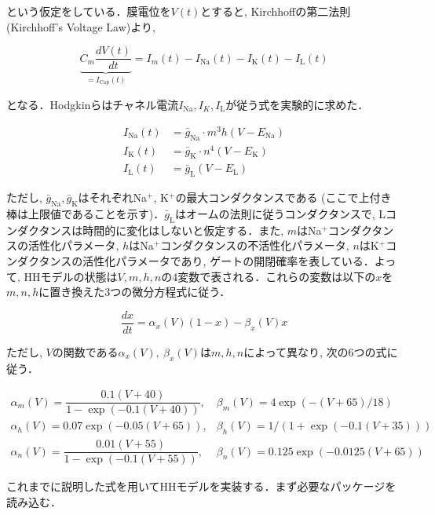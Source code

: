 \documentclass[titlepage]{ltjsbook}
\begin{document}
{という仮定をしている．膜電位を$V(t)$とすると, Kirchhoffの第二法則 (Kirchhoff's Voltage Law)より, 

$$
\begin{equation}
\underbrace{C_m\frac {dV(t)}{dt}}_{= I_\text{Cap} (t)}=I_{m}(t)-I_\text{Na}(t)-I_\text{K}(t)-I_\text{L}(t)
\end{equation}
$$

となる．Hodgkinらはチャネル電流$I_\text{Na}, I_K, I_\text{L}$が従う式を実験的に求めた．

$$
\begin{align}
I_\text{Na}(t) &= \bar{g}_{\text{Na}}\cdot m^{3}h(V-E_{\text{Na}})\\
I_\text{K}(t) &= \bar{g}_{\text{K}}\cdot n^{4}(V-E_{\text{K}})\\
I_\text{L}(t) &= \bar{g}_{\text{L}}(V-E_{\text{L}})
\end{align}
$$

ただし, $\bar{g}_{\text{Na}}, \bar{g}_{\text{K}}$はそれぞれNa$^+$, K$^+$の最大コンダクタンスである (ここで上付き棒は上限値であることを示す)．$\bar{g}_{\text{L}}$はオームの法則に従うコンダクタンスで, Lコンダクタンスは時間的に変化はしないと仮定する．また, $m$はNa$^+$コンダクタンスの活性化パラメータ, $h$はNa$^+$コンダクタンスの不活性化パラメータ, $n$はK$^+$コンダクタンスの活性化パラメータであり, ゲートの開閉確率を表している．よって, HHモデルの状態は$V, m, h, n$の4変数で表される．これらの変数は以下の$x$を$m, n, h$に置き換えた3つの微分方程式に従う． 

$$
\begin{equation}
\frac{dx}{dt}=\alpha_{x}(V)(1-x)-\beta_{x}(V)x
\end{equation}
$$

ただし, $V$の関数である$\alpha_{x}(V),\ \beta_{x}(V)$は$m, h, n$によって異なり, 次の6つの式に従う．

$$
\begin{equation}
\begin{array}{ll}
\alpha_{m}(V)=\dfrac {0.1(V+40)}{1-\exp (-0.1(V+40))}, &\beta_{m}(V)=4\exp {(-(V+65)/18)}\\
\alpha_{h}(V)=0.07\exp {(-0.05(V+65))}, & \beta_{h}(V)=1/(1+{\exp {\left(-0.1(V+35)\right)}})\\
\alpha_{n}(V)={\dfrac {0.01(V+55)}{1-\exp {\left(-0.1(V+55)\right)}}},& \beta_{n}(V)=0.125\exp {(-0.0125(V+65))} 
\end{array}
\end{equation}
$$

これまでに説明した式を用いてHHモデルを実装する．まず必要なパッケージを読み込む．

}
\end{document}
